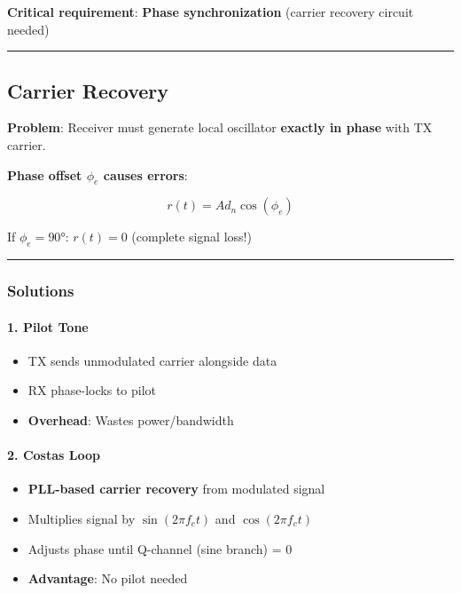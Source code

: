 \textbf{Critical requirement}: \textbf{Phase synchronization} (carrier
recovery circuit needed)

\begin{center}\rule{0.5\linewidth}{0.5pt}\end{center}

\subsection{Carrier Recovery}\label{carrier-recovery}

\textbf{Problem}: Receiver must generate local oscillator
\textbf{exactly in phase} with TX carrier.

\textbf{Phase offset \(\phi_e\) causes errors}:

\[
r(t) = A d_n \cos(\phi_e)
\]

If \(\phi_e = 90°\): \(r(t) = 0\) (complete signal loss!)

\begin{center}\rule{0.5\linewidth}{0.5pt}\end{center}

\subsubsection{Solutions}\label{solutions}

\paragraph{1. Pilot Tone}\label{pilot-tone}

\begin{itemize}
\tightlist
\item
  TX sends unmodulated carrier alongside data
\item
  RX phase-locks to pilot
\item
  \textbf{Overhead}: Wastes power/bandwidth
\end{itemize}

\paragraph{2. Costas Loop}\label{costas-loop}

\begin{itemize}
\tightlist
\item
  \textbf{PLL-based carrier recovery} from modulated signal
\item
  Multiplies signal by \(\sin(2\pi f_c t)\) and \(\cos(2\pi f_c t)\)
\item
  Adjusts phase until Q-channel (sine branch) = 0
\item
  \textbf{Advantage}: No pilot needed
\end{itemize}

